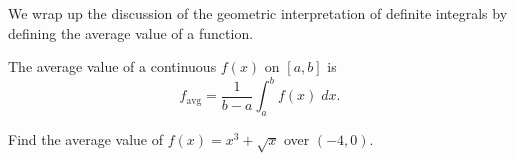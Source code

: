 \documentclass[../main.tex]{subfiles}
\begin{document}
We wrap up the discussion of the geometric interpretation of definite integrals by defining the average value of a function. 


The average value of a continuous \(f(x)\) on \([a,b]\) is
\[
  f_{\text{avg}} = \frac{1}{b-a} \int_{a}^{b} f(x) \;dx.
\]

\begin{example}
  Find the average value of \(f(x) = x^{3} + \sqrt{x}\) over \((-4,0)\).

\end{example}
\end{document}
